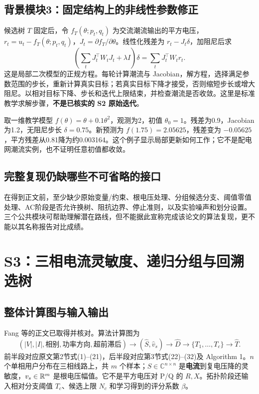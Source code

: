 \subsection{背景模块3：固定结构上的非线性参数修正}
候选树 $T$ 固定后，令 $f_T(\theta;p_t,q_t)$ 为交流潮流输出的平方电压，$r_t=u_t-f_T(\theta;p_t,q_t)$，$J_t=\partial f_T/\partial\theta$。线性化残差为 $r_t-J_t\delta$，加阻尼后求
\begin{equation}
 \left(\sum_tJ_t^\top W_tJ_t+\lambda I\right)\delta
 =\sum_tJ_t^\top W_tr_t.\label{eq:tb-gn}
\end{equation}
这是局部二次模型的正规方程。每轮计算潮流与 Jacobian，解方程，选择满足参数范围的步长，重新计算真实目标；若真实目标下降才接受，否则缩短步长或增大阻尼。以相对目标下降、步长和迭代上限结束，并检查潮流是否收敛。这里是标准教学求解步骤，\textbf{不是已核实的 S2 原始迭代}。

\begin{example}[为什么需要重新计算真实目标]
取一维教学模型 $f(\theta)=\theta+0.1\theta^2$，观测为2，初值 $\theta_0=1$。残差为0.9，Jacobian为1.2，无阻尼步长 $\delta=0.75$。新预测为 $f(1.75)=2.05625$，残差变为 $-0.05625$，平方残差从0.81降为约0.003164。这个例子显示局部更新如何工作；它不是配电网潮流实例，也不证明任意初值都收敛。
\end{example}

\subsection{完整复现仍缺哪些不可省略的接口}
在得到正文前，至少缺少原始变量/约束、根电压处理、分组候选分支、阈值零值处理、AC阶段是否允许换树、阻抗边界、停止准则，以及实验噪声和划分设置。三个公共模块可帮助理解潜在路线，但不能据此宣称完成该论文的算法复现，更不能以其名称报告对比成绩。

\section{S3：三相电流灵敏度、递归分组与回溯选树}
\subsection{整体计算图与输入输出}
Fang 等\citep{S3}的正文已取得并核对。算法计算图为
\begin{equation*}
 (|V|,|I|,\text{相别},\text{功率方向},\text{超前滞后})
 \longrightarrow(\widehat S,\widehat v_s)
 \longrightarrow\widehat D
 \longrightarrow\{T_1,\ldots,T_c\}
 \longrightarrow\widehat T.
\end{equation*}
前半段对应原文第2节式(1)--(21)，后半段对应第3节式(22)--(32)及 Algorithm 1。$n$ 个单相用户分布在三相线路上，共 $m$ 个样本；$S\in\mathbb C^{n\times n}$ 是\textbf{电流}到复电压降的灵敏度，$v_s\in\mathbb{R}^m$ 是根电压幅值。它不是平方电压对 P/Q 的 $R,X$。拓扑阶段还输入相对分支阈值 $T_c$、候选上限 $N_c$ 和学习得到的评分系数 $\beta$。

